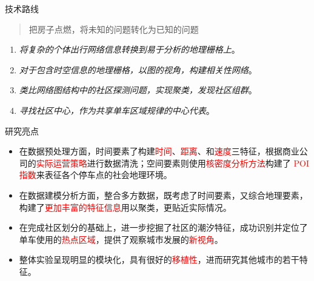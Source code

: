 \documentclass[11pt,aspectratio=149]{ctexbeamer}
\newcommand{\textred}[1]{\textcolor{red}{#1}}
\begin{document}
\begin{frame}{技术路线}
\begin{quote}
把房子点燃，将未知的问题转化为已知的问题
\end{quote}


\begin{mydef}
\begin{enumerate}
    \item \textit{将复杂的个体出行网络信息转换到易于分析的地理栅格上}。
    \item \textit{对于包含时空信息的地理栅格，以图的视角，构建相关性网络}。
    \item \textit{类比网络图结构中的社区探测问题，实现聚类，发现社区组群}。
    \item \textit{寻找社区中心，作为共享单车区域规律的中心代表}。
\end{enumerate}
\end{mydef}
\end{frame}

\begin{frame}{研究亮点}
\begin{itemize}
    \item 在数据预处理方面，时间要素了构建\textred{时间}、\textred{距离}、和\textred{速度}三特征，根据商业公司的\textred{实际运营策略}进行数据清洗；空间要素则使用\textred{核密度分析方法}构建了 \textred{POI 指数}来表征各个停车点的社会地理环境。
    \item 在数据建模分析方面，整合多方数据，既考虑了时间要素，又综合地理要素，构建了\textred{更加丰富的特征信息}用以聚类，更贴近实际情况。
    \item 在完成社区划分的基础上，进一步挖掘了社区的潮汐特征，成功识别并定位了单车使用的\textred{热点区域}，提供了观察城市发展的\textred{新视角}。
    \item 整体实验呈现明显的模块化，具有很好的\textred{移植性}，进而研究其他城市的若干特征。
\end{itemize}




\end{frame}

\end{document}
